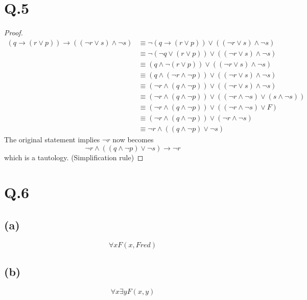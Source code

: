 \documentclass[a4paper,12pt]{article}
\begin{document}
\section*{Q.5}

\begin{proof}
	\begin{align*}
		(q \to (r \vee p)) \to ((\neg r \vee s) \wedge  \neg s) & \equiv \neg (q \to (r \vee p)) \vee ((\neg r \vee s) \wedge  \neg s)\\
		& \equiv \neg (\neg q \vee (r \vee p)) \vee ((\neg r \vee s) \wedge  \neg s)\\
		& \equiv (q \wedge \neg (r \vee p)) \vee ((\neg r \vee s) \wedge  \neg s)\\
		& \equiv (q \wedge (\neg r \wedge \neg p)) \vee ((\neg r \vee s) \wedge  \neg s)\\
		& \equiv (\neg r \wedge (q \wedge \neg p)) \vee ((\neg r \vee s) \wedge  \neg s)\\
		& \equiv (\neg r \wedge (q \wedge \neg p)) \vee ((\neg r \wedge \neg s) \vee (s \wedge \neg s))\\
		& \equiv (\neg r \wedge (q \wedge \neg p)) \vee ((\neg r \wedge \neg s) \vee F)\\
		& \equiv (\neg r \wedge (q \wedge \neg p)) \vee (\neg r \wedge \neg s)\\
		& \equiv \neg r \wedge ((q \wedge \neg p) \vee \neg s)
	\end{align*}
	The original statement implies $\neg r$ now becomes 
	\begin{equation*}
		\neg r \wedge ((q \wedge \neg p) \vee \neg s) \to \neg r
	\end{equation*}
	which is a tautology. (Simplification rule)
\end{proof}

\section*{Q.6}
\subsection*{(a)}
\begin{equation*}
	\forall x F(x, Fred)
\end{equation*}

\subsection*{(b)}
\begin{equation*}
	\forall x \exists y F(x, y)
\end{equation*}
\end{document}
